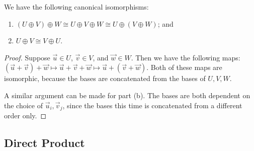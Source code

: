 \begin{proposition}\label{prop:vsp-sum-iso}
    We have the following canonical isomorphisms:
    \begin{enumerate}[label={(\alph*)}, itemsep=0mm]
        \item \((U \oplus V) \oplus W \cong U \oplus V \oplus W \cong U \oplus (V \oplus W)\); and
        \item \(U \oplus V \cong V \oplus U\).
    \end{enumerate}
\end{proposition}
\begin{proof}
    Suppose \(\vec{u} \in U\), \(\vec{v} \in V\), and \(\vec{w} \in W\).
    Then we have the following maps:
    \((\vec{u}+\vec{v})+\vec{w} \mapsto \vec{u}+\vec{v}+\vec{w} \mapsto \vec{u}+(\vec{v}+\vec{w})\).
    Both of these maps are isomorphic,
    because the bases are concatenated from the bases of \(U,V,W\).

    A similar argument can be made for part (b).
    The bases are both dependent on the choice of \(\vec{u}_i,\vec{v}_j\),
    since the bases this time is concatenated from a different order only.
\end{proof}
    


\subsection*{Direct Product}

